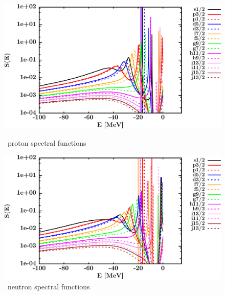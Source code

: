 \begin{figure}[hbtp]
    \centering
    \begin{minipage}{0.42\textwidth}
        \centering
        \includegraphics[width=\textwidth]{figures/pb208_protonSpectralFunctions.png}
        \caption*{\pbEight\ proton spectral functions}
        \label{DOMFitData_pb208_proton_spectralFunctions}
    \end{minipage}\hspace{6pt}
    \begin{minipage}{0.42\textwidth}
        \centering
        \includegraphics[width=\linewidth]{figures/pb208_neutronSpectralFunctions.png}
        \caption*{\pbEight\ neutron spectral functions}
        \label{DOMFitData_pb208_neutron_spectralFunctions}
    \end{minipage}
\end{figure}
\afterpage{\clearpage}
